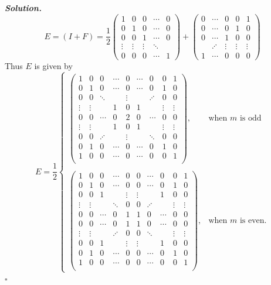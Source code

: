 \documentclass[12pt]{report}
\newenvironment{solution}[1][\it{Solution}]{\textbf{#1. } }{$\square$}
\begin{document}
\begin{solution}
    \[ E = (I + F) = \frac{1}{2}\begin{pmatrix} 1 & 0 & 0 & \cdots & 0\\ 0 & 1 & 0  & \cdots & 0 \\ 0 & 0 & 1 & \cdots & 0 \\ \vdots & \vdots & \vdots & \ddots \\ 0 & 0 & 0 & \cdots & 1\end{pmatrix} + \begin{pmatrix}
        0&\cdots&0&0&1\\
        0&\cdots&0&1&0\\
        0&\cdots&1&0&0\\
        &\iddots&\vdots&\vdots&\vdots\\
        1&\cdots&0&0&0
   \end{pmatrix}
    \]
   Thus $E$ is given by
   \[
        E = \frac{1}{2}\begin{cases}
            \begin{pmatrix}
                1&0&0&\cdots&0&\cdots&0&0&1\\
                0&1&0&\cdots&0&\cdots&0&1&0\\
                0&0&\ddots&&\vdots&&\iddots&0&0\\
                \vdots&\vdots&&1&0&1&&\vdots&\vdots\\
                0&0&\cdots&0&2&0&\cdots&0&0\\
                \vdots&\vdots&&1&0&1&&\vdots&\vdots\\
                0&0&\iddots&&\vdots&&\ddots&0&0\\
                0&1&0&\cdots&0&\cdots&0&1&0\\
                1&0&0&\cdots&0&\cdots&0&0&1\\
            \end{pmatrix}, & \text{when $m$ is odd}\\
            \\
            \begin{pmatrix}
                1&0&0&\cdots&0&0&\cdots&0&0&1\\
                0&1&0&\cdots&0&0&\cdots&0&1&0\\
                0&0&1&&\vdots&\vdots&&1&0&0\\
                \vdots&\vdots&&\ddots&0&0&\iddots&&\vdots&\vdots\\
                0&0&\cdots&0&1&1&0&\cdots&0&0\\
                0&0&\cdots&0&1&1&0&\cdots&0&0\\
                \vdots&\vdots&&\iddots&0&0&\ddots&&\vdots&\vdots\\
                0&0&1&&\vdots&\vdots&&1&0&0\\
                0&1&0&\cdots&0&0&\cdots&0&1&0\\
                1&0&0&\cdots&0&0&\cdots&0&0&1\\
            \end{pmatrix}, &\text{when $m$ is even.}
        \end{cases}
   \]
\end{solution}
\end{document}
